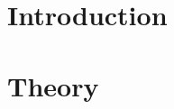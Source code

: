 \documentclass[aps,prl,preprint,groupedaddress]{revtex4-1}
\begin{document}
\pacs{}

\maketitle

\section{Introduction}


\subsection{}
\subsubsection{}

\section{Theory}
\end{document}
